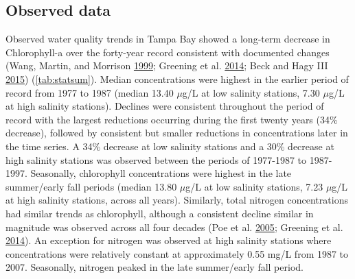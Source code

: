 \documentclass[]{article}
\begin{document}
\hypertarget{observed-data}{%
\subsection{Observed data}\label{observed-data}}

Observed water quality trends in Tampa Bay showed a long-term decrease
in Chlorophyll-a over the forty-year record consistent with documented
changes (Wang, Martin, and Morrison
\protect\hyperlink{ref-Wang99}{1999}; Greening et al.
\protect\hyperlink{ref-Greening2014}{2014}; Beck and Hagy III
\protect\hyperlink{ref-Beck15}{2015}) (\cref{tab:statsum}). Median
concentrations were highest in the earlier period of record from 1977 to
1987 (median 13.40 \(\mu\)g/L at low salinity stations, 7.30 \(\mu\)g/L
at high salinity stations). Declines were consistent throughout the
period of record with the largest reductions occurring during the first
twenty years (34\% decrease), followed by consistent but smaller
reductions in concentrations later in the time series. A 34\% decrease
at low salinity stations and a 30\% decrease at high salinity stations
was observed between the periods of 1977-1987 to 1987-1997. Seasonally,
chlorophyll concentrations were highest in the late summer/early fall
periods (median 13.80 \(\mu\)g/L at low salinity stations, 7.23
\(\mu\)g/L at high salinity stations, across all years). Similarly,
total nitrogen concentrations had similar trends as chlorophyll,
although a consistent decline similar in magnitude was observed across
all four decades (Poe et al. \protect\hyperlink{ref-Poe05}{2005};
Greening et al. \protect\hyperlink{ref-Greening2014}{2014}). An
exception for nitrogen was observed at high salinity stations where
concentrations were relatively constant at approximately 0.55 mg/L from
1987 to 2007. Seasonally, nitrogen peaked in the late summer/early fall
period.
\end{document}
